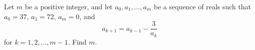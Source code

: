 Let $m$ be a positive integer, and let $a_0, a_1,\ldots,a_m$ be a sequence of reals such that $a_0=37$, $a_1=72$, $a_m=0$, and \[a_{k+1}=a_{k-1}-\frac{3}{a_k}\]for $k=1,2, \dots, m-1$. Find $m$.